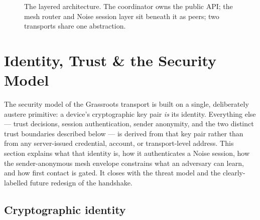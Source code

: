 \documentclass[11pt]{report}
\begin{document}
\begin{figure}[htbp]\centering
{}
\caption{The layered architecture. The coordinator owns the public API; the mesh router and Noise session layer sit beneath it as peers; two transports share one abstraction.}
\label{fig:layers}
\end{figure}


\section{Identity, Trust \& the Security Model}

The security model of the Grassroots transport is built on a single, deliberately austere primitive: a device's cryptographic key pair \emph{is} its identity. Everything else — trust decisions, session authentication, sender anonymity, and the two distinct trust boundaries described below — is derived from that key pair rather than from any server-issued credential, account, or transport-level address. This section explains what that identity is, how it authenticates a Noise session, how the sender-anonymous mesh envelope constrains what an adversary can learn, and how first contact is gated. It closes with the threat model and the clearly-labelled future redesign of the handshake.

\subsection{Cryptographic identity}
\end{document}
